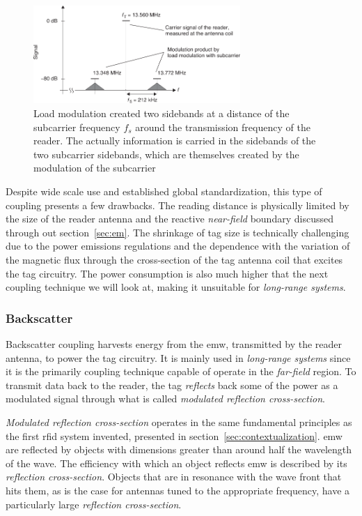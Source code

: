 \begin{figure}[!ht]
    \centering
    \includegraphics[width=0.7\textwidth]{./figs/02-state-of-the-art/loadmodulation_sidebands.pdf}
    \caption{Load modulation created two sidebands at a distance of the subcarrier frequency $f_s$ around the transmission frequency of the reader. The actually information is carried in the sidebands of the two subcarrier sidebands, which are themselves created by the modulation of the subcarrier ~\cite{finkenzellerRFIDHandbookFundamentals2003}} 
    \label{fig:loadmodulationsidebands}
\end{figure}

Despite wide scale use and established global standardization, this type of coupling presents a few drawbacks. The reading distance is physically limited by the size of the reader antenna and the reactive \emph{near-field} boundary discussed through out section~\ref{sec:em}. The shrinkage of tag size is technically challenging due to the power emissions regulations and the dependence with the variation of the magnetic flux through the cross-section of the tag antenna coil that excites the tag circuitry. The power consumption is also much higher that the next coupling technique we will look at, making it unsuitable for \emph{long-range systems}.  

\subsubsection{Backscatter}

Backscatter coupling harvests energy from the \ac{emw}, transmitted by the reader antenna, to power the tag circuitry. It is mainly used in \emph{long-range systems} since it is the primarily coupling technique capable of operate in the \emph{far-field} region.
To transmit data back to the reader, the tag \textit{reflects} back some of the power as a modulated signal through what is called \emph{modulated reflection cross-section}.

\emph{Modulated reflection cross-section} operates in the same fundamental principles as the first \ac{rfid} system invented, presented in section~\ref{sec:contextualization}.
\ac{emw} are reflected by objects with dimensions greater than around half the wavelength of the wave.
The efficiency with which an object reflects \ac{emw} is described by its \emph{reflection cross-section}. Objects that are in resonance with the wave front that hits them, as is the case for antennas tuned to the appropriate frequency, have a particularly large \emph{reflection cross-section}.


